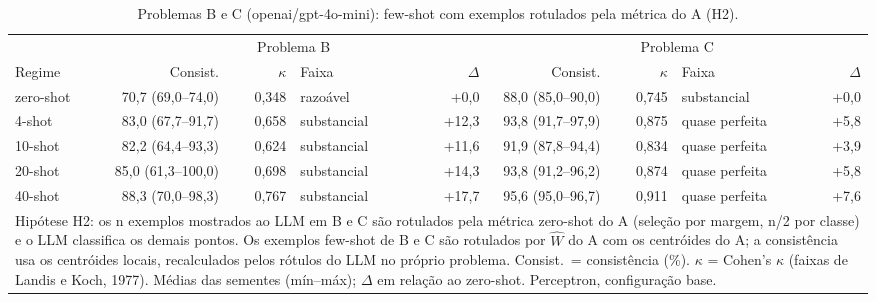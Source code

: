 \begin{table}[htbp]
\centering
\small
\caption{Problemas B e C (openai/gpt-4o-mini): few-shot com exemplos rotulados pela métrica do A (H2).}
\label{tab:bloco1_BC_fewshot_exemplos_da_metrica_gpt4mini}
\begin{tabular}{lrrlrrrlr}
\toprule
 & \multicolumn{4}{c}{Problema B} & \multicolumn{4}{c}{Problema C} \\ \cmidrule(lr){2-5} \cmidrule(lr){6-9}
Regime & Consist. & $\kappa$ & Faixa & $\Delta$ & Consist. & $\kappa$ & Faixa & $\Delta$ \\
\midrule
zero-shot & 70,7 (69,0–74,0) & 0,348 & razoável & +0,0 & 88,0 (85,0–90,0) & 0,745 & substancial & +0,0 \\
4-shot & 83,0 (67,7–91,7) & 0,658 & substancial & +12,3 & 93,8 (91,7–97,9) & 0,875 & quase perfeita & +5,8 \\
10-shot & 82,2 (64,4–93,3) & 0,624 & substancial & +11,6 & 91,9 (87,8–94,4) & 0,834 & quase perfeita & +3,9 \\
20-shot & 85,0 (61,3–100,0) & 0,698 & substancial & +14,3 & 93,8 (91,2–96,2) & 0,874 & quase perfeita & +5,8 \\
40-shot & 88,3 (70,0–98,3) & 0,767 & substancial & +17,7 & 95,6 (95,0–96,7) & 0,911 & quase perfeita & +7,6 \\
\bottomrule
\multicolumn{9}{p{0.95\linewidth}}{\footnotesize Hipótese H2: os n exemplos mostrados ao LLM em B e C são rotulados pela métrica zero-shot do A (seleção por margem, n/2 por classe) e o LLM classifica os demais pontos. Os exemplos few-shot de B e C são rotulados por $\hat{W}$ do A com os centróides do A; a consistência usa os centróides locais, recalculados pelos rótulos do LLM no próprio problema. Consist.\ = consistência (\%). $\kappa$ = Cohen's $\kappa$ (faixas de Landis e Koch, 1977). Médias das sementes (mín–máx); $\Delta$ em relação ao zero-shot. Perceptron, configuração base.} \\
\end{tabular}
\end{table}
